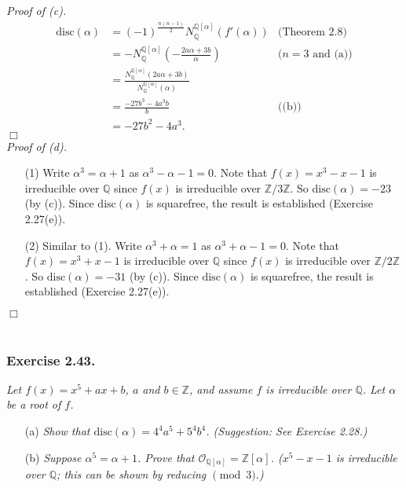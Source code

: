 \documentclass{article}
\begin{document}
\emph{Proof of (c).}
\begin{align*}
  \textrm{disc}(\alpha)
  &= (-1)^{\frac{n(n-1)}{2}} N_{\mathbb{Q}}^{\mathbb{Q}[\alpha]}(f'(\alpha))
    &\text{(Theorem 2.8)} \\
  &= - N_{\mathbb{Q}}^{\mathbb{Q}[\alpha]}\left( -\frac{2a\alpha+3b}{\alpha} \right)
    &\text{($n=3$ and (a))} \\
  &= \frac{N_{\mathbb{Q}}^{\mathbb{Q}[\alpha]}(2a\alpha+3b)}
    {N_{\mathbb{Q}}^{\mathbb{Q}[\alpha]}(\alpha)} \\
  &= \frac{-27b^3-4a^3b}{b}
    &\text{((b))} \\
  &= -27b^2-4a^3.
\end{align*}
$\Box$ \\



\emph{Proof of (d).}
\begin{enumerate}
\item[(1)]
  Write $\alpha^3 = \alpha + 1$ as $\alpha^3 - \alpha - 1 = 0$.
  Note that $f(x) = x^3 - x - 1$ is irreducible over $\mathbb{Q}$
  since $f(x)$ is irreducible over $\mathbb{Z}/3\mathbb{Z}$.
  So $\textrm{disc}(\alpha) = -23$ (by (c)).
  Since $\textrm{disc}(\alpha)$ is squarefree,
  the result is established (Exercise 2.27(e)).

\item[(2)]
  Similar to (1).
  Write $\alpha^3 + \alpha = 1$ as $\alpha^3 + \alpha - 1 = 0$.
  Note that $f(x) = x^3 + x - 1$ is irreducible over $\mathbb{Q}$
  since $f(x)$ is irreducible over $\mathbb{Z}/2\mathbb{Z}$.
  So $\textrm{disc}(\alpha) = -31$ (by (c)).
  Since $\textrm{disc}(\alpha)$ is squarefree,
  the result is established (Exercise 2.27(e)).
\end{enumerate}
$\Box$ \\\\






\subsubsection*{Exercise 2.43.}
\emph{Let $f(x) = x^5+ax+b$, $a$ and $b \in \mathbb{Z}$,
and assume $f$ is irreducible over $\mathbb{Q}$.
Let $\alpha$ be a root of $f$.}
\begin{enumerate}
\item[(a)]
  \emph{Show that $\textrm{disc}(\alpha) = 4^4 a^5 + 5^4 b^4$. (Suggestion: See Exercise 2.28.)}

\item[(b)]
  \emph{Suppose $\alpha^5=\alpha+1$.
  Prove that $\mathcal{O}_{\mathbb{Q}[\alpha]} = \mathbb{Z}[\alpha]$.
  ($x^5 - x - 1$ is irreducible over $\mathbb{Q}$;
  this can be shown by reducing $\pmod{3}$.)} \\
\end{enumerate}
\end{document}
